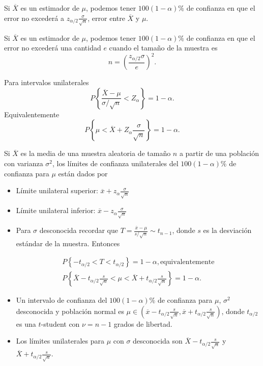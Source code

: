\begin{itemize}
\begin{enumerate}
\begin{Teo}
Si $\overline{X}$ es un estimador de $\mu$, podemos tener $100\left(1-\alpha\right)\%$  de confianza en que el error no exceder\'a a $z_{\alpha/2}\frac{\sigma}{\sqrt{n}}$, error entre $\overline{X}$ y $\mu$.
\end{Teo}

\begin{Teo}
Si $\overline{X}$ es un estimador de $\mu$, podemos tener $100\left(1-\alpha\right)\%$  de confianza en que el error no exceder\'a una cantidad $e$ cuando el tama\~no de la muestra es $$n=\left(\frac{z_{\alpha/2}\sigma}{e}\right)^{2}.$$
\end{Teo}
\begin{Note}
Para intervalos unilaterales
$$P\left\{\frac{\overline{X}-\mu}{\sigma/\sqrt{n}}<Z_{\alpha}\right\}=1-\alpha.$$
Equivalentemente
$$P\left\{\mu<\overline{X}+Z_{\alpha}\frac{\sigma}{\sqrt{n}}\right\}=1-\alpha.$$
\end{Note}

Si $\overline{X}$ es la media de una muestra aleatoria de tama\~no $n$  a partir de una poblaci\'on con varianza $\sigma^{2}$, los l\'imites de confianza unilaterales del   $100\left(1-\alpha\right)\%$  de confianza para $\mu$ est\'an dados por
\begin{itemize}
\item L\'imite unilateral superior: $\overline{x}+z_{\alpha}\frac{\sigma}{\sqrt{n}}$
\item L\'imite unilateral inferior: $\overline{x}-z_{\alpha}\frac{\sigma}{\sqrt{n}}$
\end{itemize}


\begin{itemize}
\item Para $\sigma$ desconocida recordar que $T=\frac{\overline{x}-\mu}{s/\sqrt{n}}\sim t_{n-1}$, donde $s$ es la desviaci\'on est\'andar de la muestra. Entonces

\begin{eqnarray*}
P\left\{-t_{\alpha/2}<T<t_{\alpha/2}\right\}=1-\alpha,\textrm{equivalentemente}\\
P\left\{\overline{X}-t_{\alpha/2}\frac{s}{\sqrt{n}}<\mu<\overline{X}+t_{\alpha/2}\frac{s}{\sqrt{n}}\right\}=1-\alpha.
\end{eqnarray*}

\item Un intervalo de confianza del $100\left(1-\alpha\right)\%$  de confianza para $\mu$, $\sigma^{2}$ desconocida y poblaci\'on normal es $\mu\in\left(\overline{x}-t_{\alpha/2}\frac{s}{\sqrt{n}},\overline{x}+t_{\alpha/2}\frac{s}{\sqrt{n}}\right)$, donde $t_{\alpha/2}$ es una $t$-student con $\nu=n-1$ grados de libertad.
\item Los l\'imites unilaterales para $\mu$ con $\sigma$ desconocida son $\overline{X}-t_{\alpha/2}\frac{s}{\sqrt{n}}$ y $\overline{X}+t_{\alpha/2}\frac{s}{\sqrt{n}}$.


\end{itemize}
\end{enumerate}
\end{itemize}
